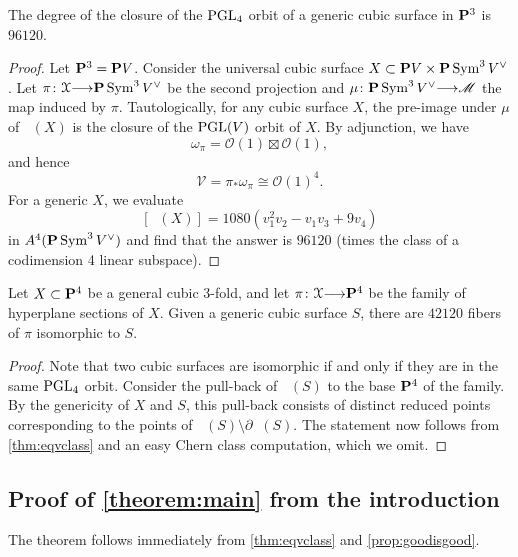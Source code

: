 \documentclass[12pt,reqno]{amsart}
\DeclareMathOperator{\Orb}{\overline{Orb}}
\renewcommand{\to}{{\longrightarrow}}
\numberwithin{equation}{section}
\renewcommand{\O}{\mathcal O}
\begin{document}
\begin{corollary}
  The degree of the closure of the $\PGL_4$ orbit of a generic cubic surface in $\P^3$ is $96120$.
\end{corollary}
\begin{proof}
  Let $\P^3 = \P V$.
  Consider the universal cubic surface $X \subset \P V\times \P \Sym^3 V^\vee$.
  Let $\pi \colon \mathcal X \to \P \Sym^3 V^\vee$ be the second projection and $\mu \colon \P \Sym^3 V^\vee \to \mathscr M$ the map induced by $\pi$.
  Tautologically, for any cubic surface $X$, the pre-image under $\mu$ of $\Orb(X)$ is the closure of the $\PGL(V)$ orbit of $X$.
  By adjunction, we have
  \[ \omega_\pi = \O(1) \boxtimes \O(1),\]
  and hence
  \[ \mathcal V = \pi_* \omega_\pi \cong \O(1)^4.\]
  For a generic $X$, we evaluate 
  \[ [\Orb(X)] = 1080(v_1^2v_2 - v_1v_3+9v_4)\]
  in $A^4(\P \Sym^3V^\vee)$ and find that the answer is $96120$ (times the class of a codimension 4 linear subspace).
\end{proof}

\begin{corollary}
  Let $X \subset \P^4$ be a general cubic 3-fold, and let $\pi \colon \mathcal X \to \P^4$ be the family of hyperplane sections of $X$.
  Given a generic cubic surface $S$, there are $42120$ fibers of $\pi$ isomorphic to $S$.
\end{corollary}
\begin{proof}
  Note that two cubic surfaces are isomorphic if and only if they are in the same $\PGL_4$ orbit.
  Consider the pull-back of $\Orb(S)$ to the base $\P^4$ of the family.
  By the genericity of $X$ and $S$, this pull-back consists of distinct reduced points corresponding to the points of $\Orb(S) \setminus \partial \Orb(S)$.
  The statement now follows from \autoref{thm:eqvclass} and an easy Chern class computation, which we omit.
\end{proof}

\subsection{Proof of \texorpdfstring{\autoref{theorem:main}}{first theorem} from the introduction}
The theorem follows immediately from \autoref{thm:eqvclass} and \autoref{prop:goodisgood}.
\end{document}
